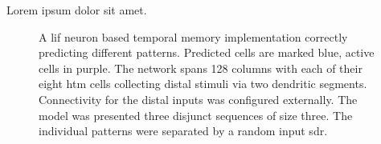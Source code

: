 Lorem ipsum dolor sit amet.

\begin{figure}
	\begin{center}
		
	\end{center}
	\caption{A \gls{lif} neuron based temporal memory implementation correctly predicting different patterns. Predicted cells are marked blue, active cells in purple. The network spans 128 columns with each of their eight \gls{htm} cells collecting distal stimuli via two dendritic segments. Connectivity for the distal inputs was configured externally. The model was presented three disjunct sequences of size three. The individual patterns were separated by a random input \gls{sdr}.}
	\label{fig:static_temporal_memory_live}
\end{figure}
